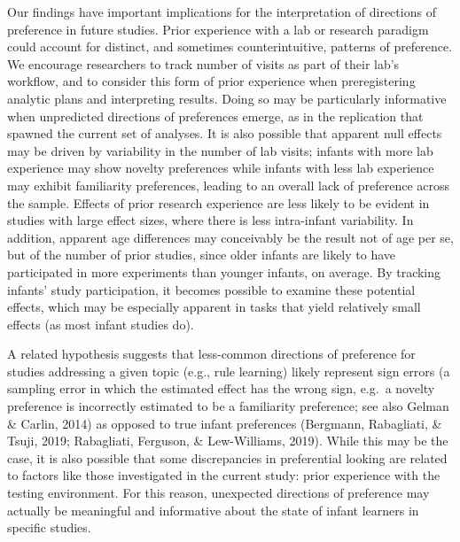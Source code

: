 \documentclass[english,man,man,floatsintext]{apa6}
\begin{document}
Our findings have important implications for the interpretation of directions of preference in future studies. Prior experience with a lab or research paradigm could account for distinct, and sometimes counterintuitive, patterns of preference.
We encourage researchers to track number of visits as part of their lab's workflow, and to consider this form of prior experience when preregistering analytic plans and interpreting results. Doing so may be particularly informative when unpredicted directions of preferences emerge, as in the replication that spawned the current set of analyses. It is also possible that apparent null effects may be driven by variability in the number of lab visits; infants with more lab experience may show novelty preferences while infants with less lab experience may exhibit familiarity preferences, leading to an overall lack of preference across the sample. Effects of prior research experience are less likely to be evident in studies with large effect sizes, where there is less intra-infant variability. In addition, apparent age differences may conceivably be the result not of age per se, but of the number of prior studies, since older infants are likely to have participated in more experiments than younger infants, on average. By tracking infants' study participation, it becomes possible to examine these potential effects, which may be especially apparent in tasks that yield relatively small effects (as most infant studies do).

A related hypothesis suggests that less-common directions of preference for studies addressing a given topic (e.g., rule learning) likely represent sign errors (a sampling error in which the estimated effect has the wrong sign, e.g.~a novelty preference is incorrectly estimated to be a familiarity preference; see also Gelman \& Carlin, 2014) as opposed to true infant preferences (Bergmann, Rabagliati, \& Tsuji, 2019; Rabagliati, Ferguson, \& Lew-Williams, 2019). While this may be the case, it is also possible that some discrepancies in preferential looking are related to factors like those investigated in the current study: prior experience with the testing environment. For this reason, unexpected directions of preference may actually be meaningful and informative about the state of infant learners in specific studies.
\end{document}
